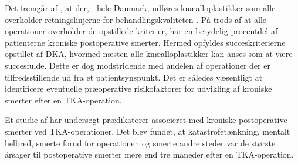 Det fremgår af , at der, i hele Danmark, udføres knæalloplastikker som alle overholder retningslinjerne for behandlingskvaliteten \citep{aarsrapport2016}. 
På trods af at alle operationer overholder de opstillede kriterier, har en betydelig procentdel af patienterne kroniske postoperative smerter.  \citep{Bourne2010} Hermed opfyldes succeskriterierne opstillet af DKA, hvormed næsten alle knæalloplastikker kan anses som at være succesfulde. Dette er dog modstridende med andelen af operationer der er tilfredsstillende ud fra et patientsynspunkt. Det er således væsentligt at identificere eventuelle præoperative risikofaktorer for udvikling af kroniske smerter efter en TKA-operation.  

Et studie af  har undersøgt prædikatorer associeret med kroniske postoperative smerter ved TKA-operationer. Det blev fundet, at katastrofetænkning, mentalt helbred, smerte forud for operationen og smerte andre steder var de største årsager til postoperative smerter mere end tre måneder efter en TKA-operation. 



%
%


	
%



